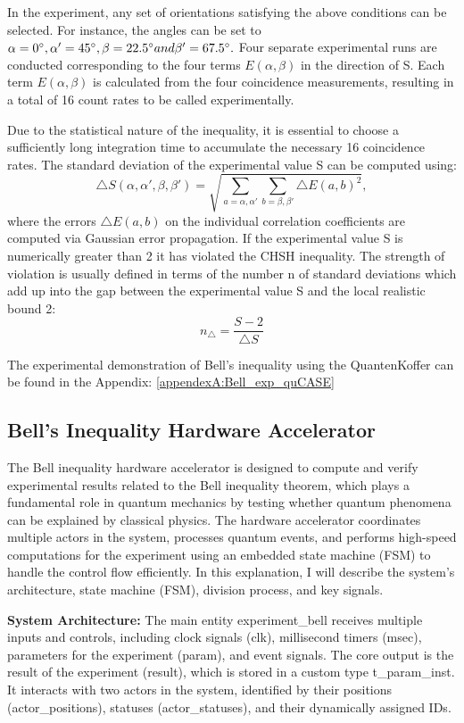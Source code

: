 In the experiment, any set of orientations satisfying the above conditions can be selected. For instance, the angles can be set to $\alpha = 0\degree, \alpha' = 45\degree, \beta = 22.5\degree and \beta'=67.5\degree.$  Four separate experimental runs are conducted corresponding to the four terms $E(\alpha, \beta)$ in the direction of S. Each term $E(\alpha, \beta)$ is calculated from the four coincidence measurements, resulting in a total of 16 count rates to be called experimentally.

Due to the statistical nature of the inequality, it is essential to choose a sufficiently long integration time to accumulate the necessary 16 coincidence rates. The standard deviation of the experimental value S can be computed using: $$ \triangle S(\alpha, \alpha', \beta, \beta') = \sqrt{\sum_{a=\alpha,\alpha'}\sum_{b = \beta, \beta'} \triangle E (a, b) ^ 2}, $$ where the errors $\triangle E(a,b)$ on the individual correlation coefficients are computed via Gaussian error propagation. If the experimental value S is numerically greater than 2 it has violated the \acs{CHSH} inequality. The strength of violation is usually defined in terms of the number n of standard deviations which add up into the gap between the experimental value S and the local realistic bound 2: $$ n_\triangle = \frac{S-2}{\triangle S}$$

The experimental demonstration of Bell's inequality using the QuantenKoffer can be found in the Appendix: \ref{appendexA:Bell_exp_quCASE}

\subsection{Bell's Inequality Hardware Accelerator}

The Bell inequality hardware accelerator is designed to compute and verify experimental results related to the Bell inequality theorem, which plays a fundamental role in quantum mechanics by testing whether quantum phenomena can be explained by classical physics. The hardware accelerator coordinates multiple actors in the system, processes quantum events, and performs high-speed computations for the experiment using an embedded state machine (\acs{FSM}) to handle the control flow efficiently. In this explanation, I will describe the system's architecture, state machine (\acs{FSM}), division process, and key signals.

\textbf{System Architecture: \newline}
The main entity experiment\_bell receives multiple inputs and controls, including clock signals (clk), millisecond timers (msec), parameters for the experiment (param), and event signals. The core output is the result of the experiment (result), which is stored in a custom type t\_param\_inst. It interacts with two actors in the system, identified by their positions (actor\_positions), statuses (actor\_statuses), and their dynamically assigned IDs.


